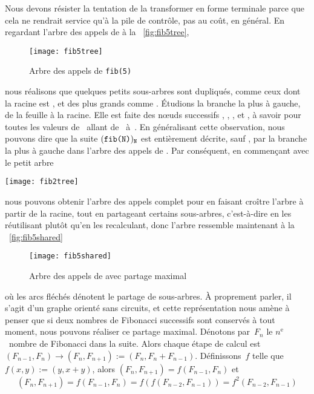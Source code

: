 Nous devons résister la tentation de la transformer en forme terminale
parce que cela ne rendrait service qu'à la pile de contrôle, pas au
coût, en général. En regardant l'arbre des appels de 
à la \fig~\vref{fig:fib5tree},
\begin{figure}
\centering
\texttt{[image: fib5tree]}
\caption{Arbre des appels de \texttt{fib(5)}}
\label{fig:fib5tree}
\end{figure}
nous réalisons que quelques petits sous-arbres sont dupliqués, comme
ceux dont la racine est , et des plus grands comme
. Étudions la branche la plus à gauche, de la feuille
à la racine. Elle est faite des nœuds successifs ,
, ,  et
, à savoir  pour toutes les valeurs
de~ allant de~ à~. En généralisant
cette observation, nous pouvons dire que la suite
\((\texttt{fib(N)})_{\texttt{N}}\) est entièrement décrite, sauf
, par la branche la plus à gauche dans l'arbre des
appels de . Par conséquent, en commençant avec le
petit arbre
\begin{center}
\texttt{[image: fib2tree]}
\end{center}
nous pouvons obtenir l'arbre des appels complet pour 
en faisant croître l'arbre à partir de la racine, tout en partageant
certains sous-arbres, c'est-à-dire en les réutilisant plutôt qu'en les
recalculant, donc l'arbre ressemble maintenant à la
\fig~\vref{fig:fib5shared}
\begin{figure}
\centering
\texttt{[image: fib5shared]}
\caption{Arbre des appels de  avec partage maximal}
\label{fig:fib5shared}
\end{figure}
où les arcs fléchés dénotent le partage de sous-arbres. À proprement
parler, il s'agit d'un graphe orienté sans circuits, et cette
représentation nous amène à penser que si deux nombres de Fibonacci
successifs sont conservés à tout moment, nous pouvons réaliser ce
partage maximal. Dénotons par~\(F_n\) le \(n^\text{e}\)~nombre de
Fibonacci dans la suite. Alors chaque étape de calcul est
\((F_{n-1},F_{n}) \rightarrow (F_{n}, F_{n+1}) :=
(F_{n},F_{n}+F_{n-1})\). Définissons~\(f\) telle que \(f(x,y) :=
(y,x+y)\), alors \((F_{n},F_{n+1}) = f(F_{n-1},F_{n})\) et
\begin{equation*}
(F_n,F_{n+1}) = f(F_{n-1},F_{n}) = f(f(F_{n-2},F_{n-1})) =
f^2(F_{n-2},F_{n-1})
\end{equation*}
